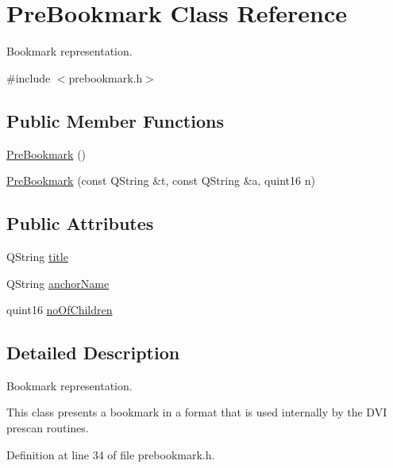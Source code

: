 \hypertarget{classPreBookmark}{\section{Pre\+Bookmark Class Reference}
\label{classPreBookmark}
}


Bookmark representation.  




{\ttfamily \#include $<$prebookmark.\+h$>$}

\subsection*{Public Member Functions}
\begin{DoxyCompactItemize}
\item 
\hyperlink{classPreBookmark_a07c8f301ebbd4aa6f778578927f38692}{Pre\+Bookmark} ()
\item 
\hyperlink{classPreBookmark_aa12665cf5c693205e229e21300861f25}{Pre\+Bookmark} (const Q\+String \&t, const Q\+String \&a, quint16 n)
\end{DoxyCompactItemize}
\subsection*{Public Attributes}
\begin{DoxyCompactItemize}
\item 
Q\+String \hyperlink{classPreBookmark_aa8fe5de25c4c6de1415189f719b75290}{title}
\item 
Q\+String \hyperlink{classPreBookmark_a4f9573f8db70a02cce2457e9030a81c4}{anchor\+Name}
\item 
quint16 \hyperlink{classPreBookmark_aafc7a8fc370a3c6eba137de09bc5a971}{no\+Of\+Children}
\end{DoxyCompactItemize}


\subsection{Detailed Description}
Bookmark representation. 

This class presents a bookmark in a format that is used internally by the D\+V\+I prescan routines. 

Definition at line 34 of file prebookmark.\+h.



